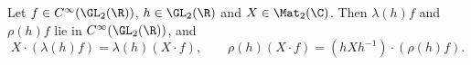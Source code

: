 Let $f\in C^\infty(\GL_2(\R))$, $h\in\GL_2(\R)$ and $X\in\Mat_2(\C)$. Then $\lambda(h)f$ and $\rho(h)f$ lie in
$C^\infty(\GL_2(\R))$, and
\[
  X\cdot(\lambda(h)f)=\lambda(h)(X\cdot f),\qquad \rho(h)(X\cdot f)=(hXh^{-1})\cdot(\rho(h)f).
\]
